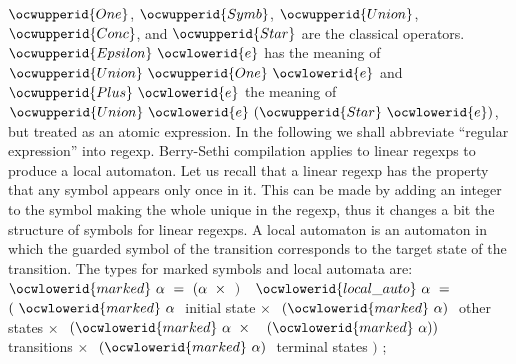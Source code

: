 \documentclass[12pt]{article}
\begin{document}
\ocwendcode{}\ocwindent{0.00em}
\ocwbegindcode{}$\ocwupperid{One}$\ocwenddcode{}, \ocwbegindcode{}$\ocwupperid{Symb}$\ocwenddcode{}, \ocwbegindcode{}$\ocwupperid{Union}$\ocwenddcode{}, \ocwbegindcode{}$\ocwupperid{Conc}$\ocwenddcode{}, and \ocwbegindcode{}$\ocwupperid{Star}$\ocwenddcode{} are the classical operators.
   \ocwbegindcode{}$\ocwupperid{Epsilon}~\ocwlowerid{e}$\ocwenddcode{} has the meaning of \ocwbegindcode{}$\ocwupperid{Union}~\ocwupperid{One}~\ocwlowerid{e}$\ocwenddcode{} and \ocwbegindcode{}$\ocwupperid{Plus}~\ocwlowerid{e}$\ocwenddcode{} the meaning of 
   \ocwbegindcode{}$\ocwupperid{Union}~\ocwlowerid{e}~(\ocwupperid{Star}~\ocwlowerid{e})$\ocwenddcode{}, but treated as an atomic expression. 
   In the following we shall abbreviate ``regular expression'' into regexp. 
\ocweol
\ocwindent{0.00em}
Berry-Sethi compilation applies to linear regexps to produce
   a local automaton. Let us recall that a linear regexp has the 
   property that any symbol appears only once in it. This can be made by 
   adding an integer to the symbol making the whole unique in the regexp, thus
   it changes a bit the structure of symbols for linear regexps.
   A local automaton is an automaton in which the guarded symbol of the 
   transition corresponds to the target state of the transition.
   The types for marked symbols and local automata are: 
\ocweol
\label{../ML/regular.ml:2997}%
\medskip
\ocwbegincode{}\ocwindent{1.00em}
~$\ocwlowerid{marked}~\alpha{}~=~(\alpha{}~\times{}~$$)~$\ocweol
\ocwindent{1.00em}
~$\ocwlowerid{local\_auto}~\alpha{}~=~$\ocweol
\ocwindent{3.00em}
$(~\ocwlowerid{marked}~\alpha{}~$\ocwbc{} initial state \ocwec{}\ocweol
\ocwindent{3.00em}
$\times{}~$~$(\ocwlowerid{marked}~\alpha{})~$\ocwbc{} other states \ocwec{}\ocweol
\ocwindent{3.00em}
$\times{}~$~$(\ocwlowerid{marked}~\alpha{}~\times{}~$~$(\ocwlowerid{marked}~\alpha{}))~$\ocwbc{} transitions \ocwec{}\ocweol
\ocwindent{3.00em}
$\times{}~$~$(\ocwlowerid{marked}~\alpha{})~$\ocwbc{} terminal states \ocwec{}\ocweol
\ocwindent{3.00em}
$)$\ocweol
\ocwindent{1.00em}
;\medskip
\end{document}
